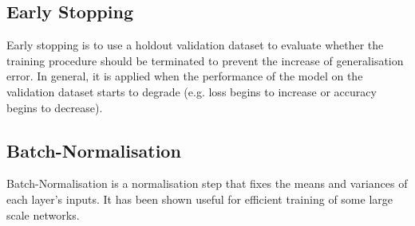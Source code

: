 \subsection{Early Stopping}

Early stopping is to use a holdout validation dataset to evaluate whether the training procedure should be terminated to prevent the increase of generalisation error. In general, it is applied when the performance of the model on the validation dataset starts to degrade (e.g. loss begins to increase or accuracy begins to decrease).


\subsection{Batch-Normalisation}

Batch-Normalisation is a normalisation step that fixes the means and variances of each layer's inputs. It has been shown useful for efficient training of  some large scale networks. 
